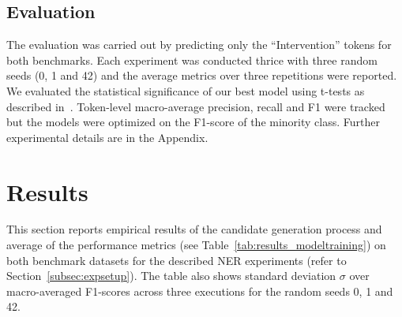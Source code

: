 \documentclass[letterpaper]{article} %
\begin{document}
\subsection{Evaluation}
\label{subsec:eval}
%
The evaluation was carried out by predicting only the ``Intervention'' tokens for both benchmarks.
Each experiment was conducted thrice with three random seeds (0, 1 and 42) and the average metrics over three repetitions were reported.
We evaluated the statistical significance of our best model using t-tests as described in~\cite{dror2018hitchhiker}.
Token-level macro-average precision, recall and F1 were tracked but the models were optimized on the F1-score of the minority class.
Further experimental details are in the Appendix.
%
\section{Results}
\label{sec:results}
%
This section reports empirical results of the candidate generation process and average of the performance metrics (see Table~\ref{tab:results_modeltraining}) on both benchmark datasets for the described NER experiments (refer to Section~\ref{subsec:expsetup}).
The table also shows standard deviation $\sigma$ over macro-averaged F1-scores across three executions for the random seeds 0, 1 and 42.
%
\end{document}
